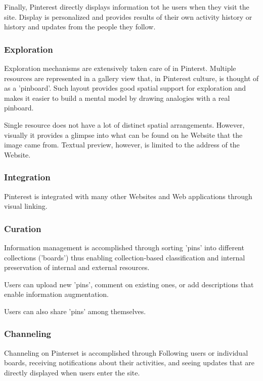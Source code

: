 {{{Finally, Pinterest directly displays information tot he users when they visit the site. Display is personalized and provides results of their own activity history or history and updates from the people they follow.
}%

 
{\subsubsection{Exploration}Exploration mechanisms are extensively taken care of in Pinterst. Multiple resources are represented in a gallery view that, in Pinterest culture, is thought of as a 'pinboard'. Such layout provides good spatial support for exploration and makes it easier to build a mental model by drawing analogies with a real pinboard. 

Single resource does not have a lot of distinct spatial arrangements. However, visually it provides a glimpse into what can be found on he Website that the image came from. Textual preview, however, is limited to the address of the Website.
}%


{\subsubsection{Integration}
Pinterest is integrated with many other Websites and Web applications through visual linking.

}%


{\subsubsection{Curation}

Information management is accomplished through sorting 'pins' into different collections ('boards') thus enabling collection-based classification and internal preservation of internal and external resources. 
}%


Users can upload new 'pins', comment on existing ones, or add descriptions that enable information augmentation. 

Users can also share 'pins' among themselves. 
{\subsubsection{Channeling}
Channeling on Pinterset is accomplished through Following users or individual boards, receiving notifications about their activities, and seeing updates that are directly displayed when users enter the site. 
}%

}}
